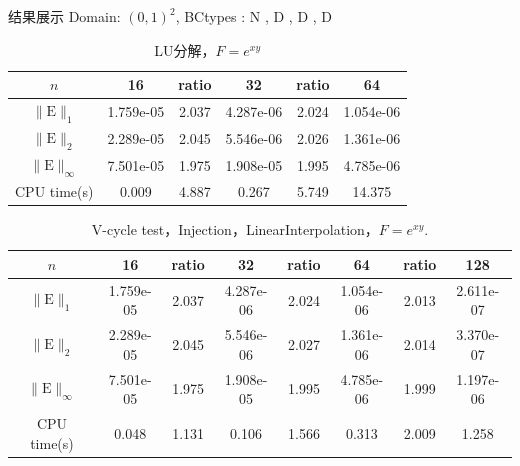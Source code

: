\documentclass{beamer}
\begin{document}
\begin{frame}{结果展示}
    \noindent Domain: $(0,1)^2$, BCtypes : N , D , D , D
\begin{table}[htbp]
\centering\begin{tabular}{c|ccccc}
\hline
$n$&16&ratio&32&ratio&64\\
\hline
$\|\mathrm{E}\|_1$&1.759e-05&2.037&4.287e-06&2.024&1.054e-06\\
\hline
$\|\mathrm{E}\|_2$&2.289e-05&2.045&5.546e-06&2.026&1.361e-06\\
\hline
$\|\mathrm{E}\|_{\infty}$&7.501e-05&1.975&1.908e-05&1.995&4.785e-06\\
\hline
CPU time(s)&0.009&4.887&0.267&5.749&14.375\\
\hline
\end{tabular}
\caption{LU分解，$F=e^{xy}$}
\end{table}

\begin{table}[htbp]
  \setlength\tabcolsep{2.5pt}
\centering\begin{tabular}{c|ccccccc}
\hline
$n$&16&ratio&32&ratio&64&ratio&128\\
\hline
$\|\mathrm{E}\|_1$&1.759e-05&2.037&4.287e-06&2.024&1.054e-06&2.013&2.611e-07\\
\hline
$\|\mathrm{E}\|_2$&2.289e-05&2.045&5.546e-06&2.027&1.361e-06&2.014&3.370e-07\\
\hline
$\|\mathrm{E}\|_{\infty}$&7.501e-05&1.975&1.908e-05&1.995&4.785e-06&1.999&1.197e-06\\
\hline
CPU time(s)&0.048&1.131&0.106&1.566&0.313&2.009&1.258\\
\hline
\end{tabular}
\caption{V-cycle test，Injection，LinearInterpolation，$F=e^{xy}$.}
\end{table}
\end{frame}

\begin{frame}{\ }

\end{frame}
\end{document}
